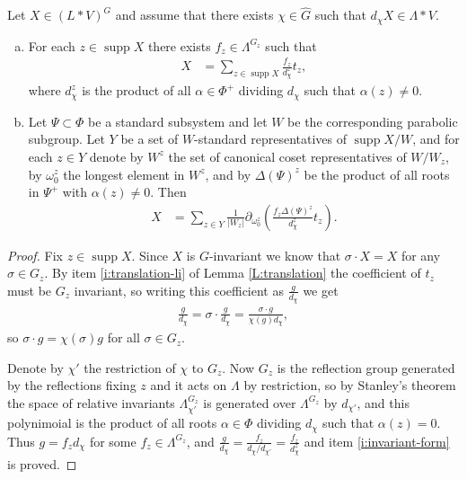 \documentclass[11pt,fleqn]{article}
\DeclareMathOperator\supp{supp}
\begin{document}
\begin{Proposition*}
Let $X \in (L*V)^G$ and assume that there exists $\chi \in \hat G$ such that 
$d_\chi X \in \Lambda * V$. 
\begin{enumerate}[(a)]
\item 
\label{i:invariant-form}
For each $z \in \supp X$ there exists $f_z \in \Lambda^{G_z}$ such that
\begin{align*}
X
	&= \sum_{z \in \supp X} \frac{f_z}{d_{\chi}^z} t_z,
\end{align*}
where $d_{\chi}^z$ is the product of all $\alpha \in \Phi^+$ dividing $d_\chi$ 
such that $\alpha(z) \neq 0$. 

\item
\label{i:dd-form}
Let $\Psi \subset \Phi$ be a standard subsystem and let $W$ be the 
corresponding parabolic subgroup. Let $Y$ be a set of $W$-standard 
representatives of $\supp X / W$, and for each $z \in Y$ denote by $W^z$ the 
set of canonical coset representatives of $W/W_z$, by $\omega_0^z$ the 
longest element in $W^z$, and by $\Delta(\Psi)^z$ be the product of all roots 
in $\Psi^+$ with $\alpha(z) \neq 0$. Then  
\begin{align*}
X
	&= \sum_{z \in Y} \frac{1}{|W_z|}
		\partial_{\omega_0^{z}}\left(
			\frac{f_z \Delta(\Psi)^z}{d_{\chi}^z} t_z
		\right).
\end{align*}
\end{enumerate}
\begin{proof}
Fix $z \in \supp X$. Since $X$ is $G$-invariant we know that $\sigma \cdot X = 
X$ for any $\sigma \in G_z$. By item \ref{i:translation-li} of Lemma
\ref{L:translation} the coefficient of $t_z$ must be $G_z$ invariant, so 
writing this coefficient as $\frac{g}{d_\chi}$ we get
\begin{align*}
\frac{g}{d_\chi} 
	= \sigma \cdot \frac{g}{d_\chi} 
	=\frac{\sigma \cdot g}{\chi(g) d_\chi},
\end{align*}
so $\sigma \cdot g = \chi(\sigma) g$ for all $\sigma \in G_z$. 

Denote by $\chi'$ the restriction of $\chi$ to $G_z$. Now $G_z$ is the 
reflection group generated by the reflections fixing $z$ and it acts on 
$\Lambda$ by restriction, so by Stanley's theorem the space of relative 
invariants $\Lambda^{G_z}_{\chi'}$ is generated over $\Lambda^{G_z}$ by 
$d_{\chi'}$, and this polynimoial is the product of all roots $\alpha \in 
\Phi$ dividing $d_\chi$ such that $\alpha(z) = 0$. Thus $g = f_z d_{\chi}$
for some $f_z \in \Lambda^{G_z}$, and $\frac{g}{d_{\chi}} = 
\frac{f_z}{d_\chi/d_{\chi'}} = \frac{f_z}{d_{\chi}^z}$ and item 
\ref{i:invariant-form} is proved. 


\end{proof}
\end{Proposition*}
\end{document}
